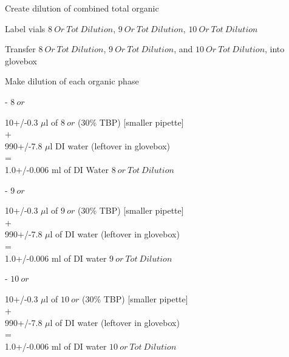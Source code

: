 \documentclass[idxtotoc,hyperref,openany,oneside]{labbook} %
\newcommand{\cmark}{\ding{51}}%
\newcommand{\done}{\rlap{$\square$}{\raisebox{2pt}{\large\hspace{1pt}\cmark}}%
  \hspace{-2.5pt}}
\begin{document}
Create dilution of combined total organic

\begin{todolist}
\item[\done]{Label vials $\boxed{8\ Or\ Tot\ Dilution}$,
  $\boxed{9\ Or\ Tot\ Dilution}$, $\boxed{10\ Or\ Tot\ Dilution}$}
\item[\done]{Transfer $\boxed{8\ Or\ Tot\ Dilution}$,
  $\boxed{9\ Or\ Tot\ Dilution}$, and $\boxed{10\ Or\ Tot\ Dilution}$,
  into glovebox}
\item[\done]{Make dilution of each organic phase}
  \begin{todolist}
  \item[\done]{- $\boxed{8\ or}$}
  \end{todolist}
  \begin{center}
    10+/-0.3 $\mu$l of $\boxed{8\ or}$
    (30\% TBP) [smaller pipette]\\
    +\\
    990+/-7.8 $\mu$l DI water (leftover in glovebox)\\
    =\\
    1.0+/-0.006 ml of DI Water $\boxed{8\ or\ Tot\ Dilution}$
  \end{center}
  \begin{todolist}
  \item[\done]{- $\boxed{9\ or}$}
  \end{todolist}
  \begin{center}
    10+/-0.3 $\mu$l of $\boxed{9\ or}$
    (30\% TBP) [smaller pipette]\\
    +\\
    990+/-7.8 $\mu$l of DI water (leftover in glovebox)\\
    =\\
    1.0+/-0.006 ml of DI water $\boxed{9\ or\ Tot\ Dilution}$
  \end{center}
  \begin{todolist}
  \item[\done]{- $\boxed{10\ or}$}
  \end{todolist}
  \begin{center}
    10+/-0.3 $\mu$l of $\boxed{10\ or}$
    (30\% TBP) [smaller pipette]\\
    +\\
    990+/-7.8 $\mu$l of DI water (leftover in glovebox)\\
    =\\
    1.0+/-0.006 ml of DI water $\boxed{10\ or\ Tot\ Dilution}$
  \end{center}
\end{todolist}
\end{document}
